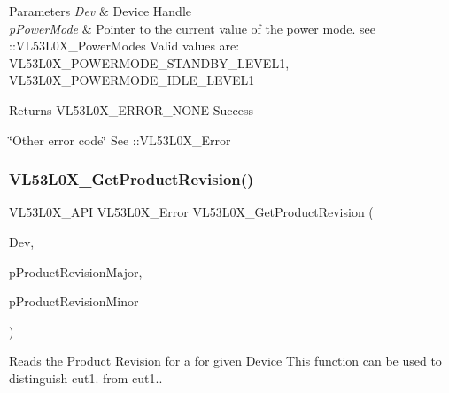 \begin{DoxyParams}{Parameters}
{\em Dev} & Device Handle \\
\hline
{\em p\+Power\+Mode} & Pointer to the current value of the power mode. see \+::\+V\+L53\+L0\+X\+\_\+\+Power\+Modes Valid values are\+: V\+L53\+L0\+X\+\_\+\+P\+O\+W\+E\+R\+M\+O\+D\+E\+\_\+\+S\+T\+A\+N\+D\+B\+Y\+\_\+\+L\+E\+V\+E\+L1, V\+L53\+L0\+X\+\_\+\+P\+O\+W\+E\+R\+M\+O\+D\+E\+\_\+\+I\+D\+L\+E\+\_\+\+L\+E\+V\+E\+L1 \\
\hline
\end{DoxyParams}
\begin{DoxyReturn}{Returns}
V\+L53\+L0\+X\+\_\+\+E\+R\+R\+O\+R\+\_\+\+N\+O\+NE Success 

\char`\"{}\+Other error code\char`\"{} See \+::\+V\+L53\+L0\+X\+\_\+\+Error 
\end{DoxyReturn}
\mbox{\label{group__VL53L0X__general__group_ga61bbb7db521494b59d82f0c0ee359260}} 
\subsubsection{\texorpdfstring{V\+L53\+L0\+X\+\_\+\+Get\+Product\+Revision()}{VL53L0X\_GetProductRevision()}}
{\footnotesize\ttfamily V\+L53\+L0\+X\+\_\+\+A\+PI V\+L53\+L0\+X\+\_\+\+Error V\+L53\+L0\+X\+\_\+\+Get\+Product\+Revision (\begin{DoxyParamCaption}\item[{\hyperlink{group__VL53L0X__platform__group_ga2d6405308b1dd524b462f1b8fb97d167}{V\+L53\+L0\+X\+\_\+\+D\+EV}}]{Dev,  }\item[{\hyperlink{vl53l0x__types_8h_aba7bc1797add20fe3efdf37ced1182c5}{uint8\+\_\+t} $\ast$}]{p\+Product\+Revision\+Major,  }\item[{\hyperlink{vl53l0x__types_8h_aba7bc1797add20fe3efdf37ced1182c5}{uint8\+\_\+t} $\ast$}]{p\+Product\+Revision\+Minor }\end{DoxyParamCaption})}



Reads the Product Revision for a for given Device This function can be used to distinguish cut1. from cut1.. 

